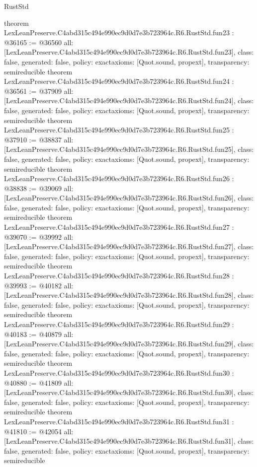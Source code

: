 \begin{lexlean}{RustStd}
\begin{coremodule}
{}
theorem LexLeanPreserve.C4abd315c494e990ec9d0d7e3b723964c.R6.RustStd.fun23 : @36165 := @36560 {
  all: [LexLeanPreserve.C4abd315c494e990ec9d0d7e3b723964c.R6.RustStd.fun23],
  class: false,
  generated: false,
  policy: exact{axioms: [Quot.sound, propext]},
  transparency: semireducible
}
theorem LexLeanPreserve.C4abd315c494e990ec9d0d7e3b723964c.R6.RustStd.fun24 : @36561 := @37909 {
  all: [LexLeanPreserve.C4abd315c494e990ec9d0d7e3b723964c.R6.RustStd.fun24],
  class: false,
  generated: false,
  policy: exact{axioms: [Quot.sound, propext]},
  transparency: semireducible
}
theorem LexLeanPreserve.C4abd315c494e990ec9d0d7e3b723964c.R6.RustStd.fun25 : @37910 := @38837 {
  all: [LexLeanPreserve.C4abd315c494e990ec9d0d7e3b723964c.R6.RustStd.fun25],
  class: false,
  generated: false,
  policy: exact{axioms: [Quot.sound, propext]},
  transparency: semireducible
}
theorem LexLeanPreserve.C4abd315c494e990ec9d0d7e3b723964c.R6.RustStd.fun26 : @38838 := @39069 {
  all: [LexLeanPreserve.C4abd315c494e990ec9d0d7e3b723964c.R6.RustStd.fun26],
  class: false,
  generated: false,
  policy: exact{axioms: [Quot.sound, propext]},
  transparency: semireducible
}
theorem LexLeanPreserve.C4abd315c494e990ec9d0d7e3b723964c.R6.RustStd.fun27 : @39070 := @39992 {
  all: [LexLeanPreserve.C4abd315c494e990ec9d0d7e3b723964c.R6.RustStd.fun27],
  class: false,
  generated: false,
  policy: exact{axioms: [Quot.sound, propext]},
  transparency: semireducible
}
theorem LexLeanPreserve.C4abd315c494e990ec9d0d7e3b723964c.R6.RustStd.fun28 : @39993 := @40182 {
  all: [LexLeanPreserve.C4abd315c494e990ec9d0d7e3b723964c.R6.RustStd.fun28],
  class: false,
  generated: false,
  policy: exact{axioms: [Quot.sound, propext]},
  transparency: semireducible
}
theorem LexLeanPreserve.C4abd315c494e990ec9d0d7e3b723964c.R6.RustStd.fun29 : @40183 := @40879 {
  all: [LexLeanPreserve.C4abd315c494e990ec9d0d7e3b723964c.R6.RustStd.fun29],
  class: false,
  generated: false,
  policy: exact{axioms: [Quot.sound, propext]},
  transparency: semireducible
}
theorem LexLeanPreserve.C4abd315c494e990ec9d0d7e3b723964c.R6.RustStd.fun30 : @40880 := @41809 {
  all: [LexLeanPreserve.C4abd315c494e990ec9d0d7e3b723964c.R6.RustStd.fun30],
  class: false,
  generated: false,
  policy: exact{axioms: [Quot.sound, propext]},
  transparency: semireducible
}
theorem LexLeanPreserve.C4abd315c494e990ec9d0d7e3b723964c.R6.RustStd.fun31 : @41810 := @42054 {
  all: [LexLeanPreserve.C4abd315c494e990ec9d0d7e3b723964c.R6.RustStd.fun31],
  class: false,
  generated: false,
  policy: exact{axioms: [Quot.sound, propext]},
  transparency: semireducible
}
\end{coremodule}
\end{lexlean}

